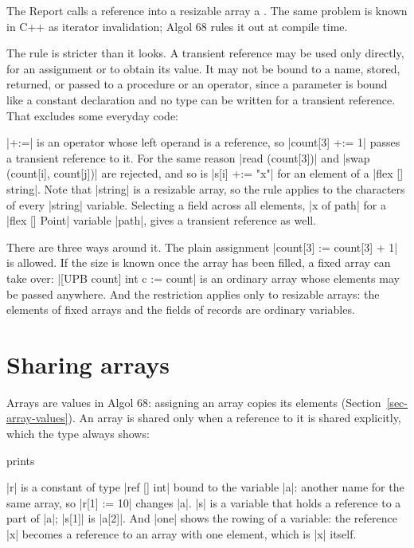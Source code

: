 The Report calls a reference into a resizable array a . The same problem is known in C++ as iterator invalidation; Algol
68 rules it out at compile time.

The rule is stricter than it looks. A transient reference may be used
only directly, for an assignment or to obtain its value. It may not be
bound to a name, stored, returned, or passed to a procedure or an
operator, since a parameter is bound like a constant declaration and no
type can be written for a transient reference. That excludes some
everyday code:


\code|+:=| is an operator whose left operand is a reference, so
\code|count[3] +:= 1| passes a transient reference to it. For the same
reason \code|read (count[3])| and \code|swap (count[i], count[j])| are
rejected, and so is \code|s[i] +:= "x"| for an element of a
\code|flex [] string|. Note that \code|string| is a resizable array, so
the rule applies to the characters of every \code|string| variable.
Selecting a field across all elements, \code|x of path| for a
\code|flex [] Point| variable \code|path|, gives a transient reference
as well.

There are three ways around it. The plain assignment
\code|count[3] := count[3] + 1| is allowed. If the size is known once the
array has been filled, a fixed array can take over:
\code|[UPB count] int c := count| is an ordinary array whose elements may
be passed anywhere. And the restriction applies only to resizable
arrays: the elements of fixed arrays and the fields of records are
ordinary variables.

\section{Sharing arrays}\label{sec-sharing}

Arrays are values in Algol 68: assigning an array copies its elements
(Section~\ref{sec-array-values}). An array is shared only when a
reference to it is shared explicitly, which the type always shows:


\noindent prints

\code|r| is a constant of type \code|ref [] int| bound to the variable
\code|a|: another name for the same array, so \code|r[1] := 10| changes
\code|a|. \code|s| is a variable that holds a reference to a part of
\code|a|; \code|s[1]| is \code|a[2]|. And \code|one| shows the rowing of
a variable: the reference \code|x| becomes a reference to an array with
one element, which is \code|x| itself.

